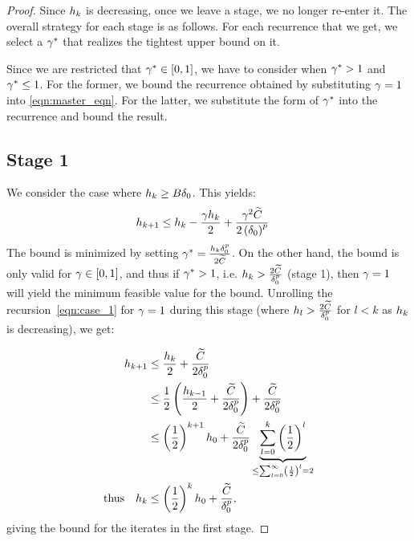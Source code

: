 \begin{proof}
	Since $h_k$ is decreasing, once we leave a stage, we no longer re-enter it. 
	The overall strategy for each stage is as follows. For each recurrence that we get, we select
	a $\gamma^*$ that realizes the tightest upper bound on it. 
%
%

	Since we are restricted that 
	$\gamma^*\in[0,1]$, we have to consider when $\gamma^*>1$ and $\gamma^*\leq 1$. For the former,
	we bound the recurrence obtained by substituting $\gamma=1$ into \eqref{eqn:master_eqn}. For the latter, 
	we substitute the form of $\gamma^*$ into the recurrence and bound the result.

	\subsection*{Stage 1}
	We consider the case where $h_k\geq B\delta_0$. This yields: 
	\begin{align}
		\label{eqn:case_1}
		h_{k+1} &\leq h_k - \frac{\gamma h_k}{2} + \frac{\gamma^2 \widetilde{C}}{2 \left(\delta_0\right)^p}	
	\end{align}
	The bound is minimized by setting $\gamma^* = \frac{h_k\delta_0^p}{2\widetilde{C}}$. On the other hand, the bound is only valid for $\gamma \in [0,1]$, and thus if $\gamma^* > 1$, i.e. $h_k > \frac{2\widetilde{C}}{\delta_0^p}$ (stage 1), then $\gamma = 1$ will yield the minimum feasible value for the bound. Unrolling the recursion~\eqref{eqn:case_1} for $\gamma = 1$ during this stage (where $h_l > \frac{2\widetilde{C}}{\delta_0^p}$ for $l < k$ as $h_k$ is decreasing), we get:
	
	\begin{align}
		h_{k+1} &\leq \frac{h_k}{2} + \frac{\widetilde{C}}{2\delta_0^p} \nonumber \\	
	&\leq \frac{1}{2}\left(\frac{h_{k-1}}{2} + \frac{\widetilde{C}}{2\delta_0^p}\right) + \frac{\widetilde{C}}{2\delta_0^p} \nonumber \\
	&\leq \left(\frac{1}{2}\right)^{k+1} h_0 + \frac{\widetilde{C}}{2\delta_0^p}\underbrace{\sum_{l=0}^{k}\left(\frac{1}{2}\right)^l}_{\leq\sum_{l=0}^{\infty}\left(\frac{1}{2}\right)^{l} = 2} \nonumber \\
	\text{thus} \quad h_k &\leq \left(\frac{1}{2}\right)^{k} h_0 + \frac{\widetilde{C}}{\delta_0^p} \label{eqn:hk_stage1},
	\end{align}
	giving the bound for the iterates in the first stage.

%
%
%
	

\end{proof}

